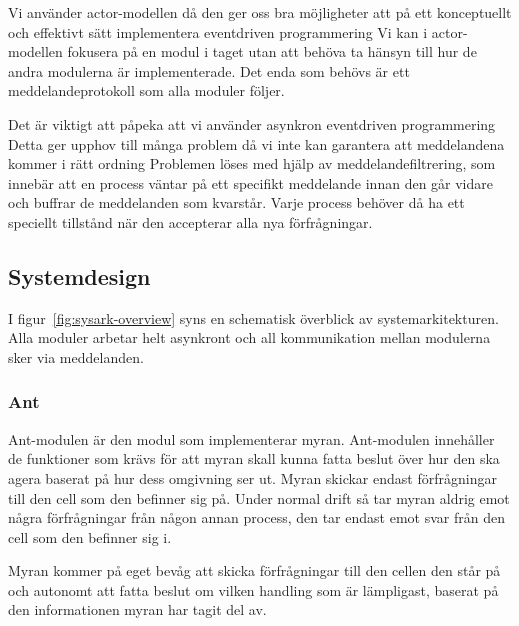 \documentclass[12pt]{article}
\begin{document}
Vi använder actor-modellen då den ger oss bra möjligheter att på ett konceptuellt och effektivt sätt implementera eventdriven programmering
Vi kan i actor-modellen fokusera på en modul i taget utan att behöva ta hänsyn till hur de andra modulerna är implementerade.
Det enda som behövs är ett meddelandeprotokoll som alla moduler följer.

Det är viktigt att påpeka att vi använder asynkron eventdriven programmering
Detta ger upphov till många problem då vi inte kan garantera att meddelandena kommer i rätt ordning
Problemen löses med hjälp av meddelandefiltrering,
som innebär att en process väntar på ett specifikt meddelande innan den går vidare och buffrar de meddelanden som kvarstår.
Varje process behöver då ha ett speciellt tillstånd när den accepterar alla nya förfrågningar.

\subsection{Systemdesign}
I figur~\ref{fig:sysark-overview} syns en schematisk överblick av systemarkitekturen.
Alla moduler arbetar helt asynkront och all kommunikation mellan modulerna sker via meddelanden.

\subsubsection{Ant}
Ant-modulen är den modul som implementerar myran.
Ant-modulen innehåller de funktioner som krävs för att myran skall kunna fatta beslut över hur den ska agera baserat på hur dess omgivning ser ut.
Myran skickar endast förfrågningar till den cell som den befinner sig på.
Under normal drift så tar myran aldrig emot några förfrågningar från någon annan process,
den tar endast emot svar från den cell som den befinner sig i.

Myran kommer på eget bevåg att skicka förfrågningar till den cellen den står på och autonomt att fatta beslut om vilken handling som är lämpligast,
baserat på den informationen myran har tagit del av.
\end{document}
